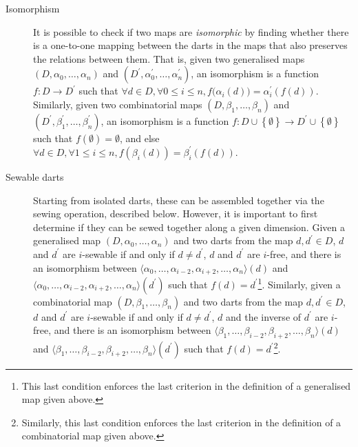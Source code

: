 \begin{description}
\item[Isomorphism]
It is possible to check if two maps are \emph{isomorphic} by finding whether there is a one-to-one mapping between the darts in the maps that also preserves the relations between them.
That is, given two generalised maps $(D,\alpha_{0},\ldots,\alpha_{n})$ and $(D^\prime,\alpha_{0}^\prime,\ldots,\alpha_{n}^\prime)$, an isomorphism is a function $f: D \rightarrow D^\prime$ such that $\forall d \in D, \forall 0 \leq i \leq n, f\big(\alpha_i\left(d\right)\big) = \alpha_i^\prime\left(f\left(d\right)\right)$.
Similarly, given two combinatorial maps $(D, \beta_{1}, \ldots, \beta_{n})$ and $(D^\prime, \beta_{1}^\prime, \ldots, \beta_{n}^\prime)$, an isomorphism is a function $f: D \cup \left\{\emptyset\right\} \rightarrow D^\prime \cup \left\{\emptyset\right\}$ such that $f(\emptyset) = \emptyset$, and else $\forall d \in D, \forall 1 \leq i \leq n, f\left(\beta_i\left(d\right)\right) = \beta_i^\prime\left(f\left(d\right)\right)$.

\item[Sewable darts]
Starting from isolated darts, these can be assembled together via the sewing operation, described below.
However, it is important to first determine if they can be sewed together along a given dimension.
Given a generalised map $(D,\alpha_{0},\ldots,\alpha_{n})$ and two darts from the map $d,d^\prime \in D$, $d$ and $d^\prime$ are $i$-sewable if and only if $d \neq d^\prime$, $d$ and $d^\prime$ are $i$-free, and there is an isomorphism between $\langle\alpha_0, \ldots, \alpha_{i-2}, \alpha_{i+2}, \ldots, \alpha_n\rangle(d)$ and $\langle\alpha_0, \ldots, \alpha_{i-2}, \alpha_{i+2}, \ldots, \alpha_n\rangle(d^\prime)$ such that $f(d) = d^\prime$\footnote{This last condition enforces the last criterion in the definition of a generalised map given above.}.
Similarly, given a combinatorial map $(D, \beta_{1}, \ldots, \beta_{n})$ and two darts from the map $d,d^\prime \in D$, $d$ and $d^\prime$ are $i$-sewable if and only if $d \neq d^\prime$, $d$ and the inverse of $d^\prime$ are $i$-free, and there is an isomorphism between $\langle\beta_1, \ldots, \beta_{i-2}, \beta_{i+2}, \ldots, \beta_n\rangle(d)$ and $\langle\beta_1, \ldots, \beta_{i-2}, \beta_{i+2}, \ldots, \beta_n\rangle(d^\prime)$ such that $f(d) = d^\prime$\footnote{Similarly, this last condition enforces the last criterion in the definition of a combinatorial map given above.}.


\end{description}
